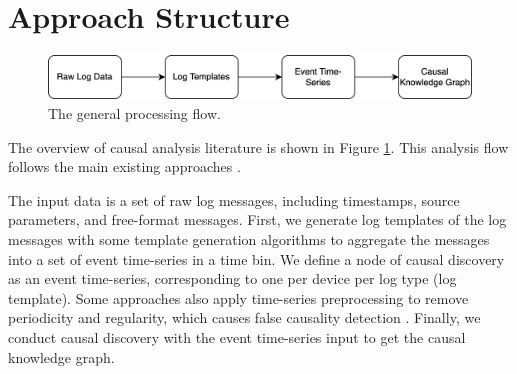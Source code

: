\section{Approach Structure}
\label{sec:2}
\begin{figure}[h]
\centering
    \label{fig:structure}
    \includegraphics[width=\textwidth]{figures/structure.png}
    \caption{The general processing flow.}
\end{figure}
The overview of causal analysis literature is shown in Figure \hyperref[fig:structure]{1}. This analysis flow follows the main existing approaches \cite{jarry2021quantitative,jia2017approach,kobayashi2017mining,lou2010mining,otomo2019latent}.\newline

The input data is a set of raw log messages, including timestamps, source parameters, and free-format messages. First, we generate log templates of the log messages with some template generation algorithms to aggregate the messages into a set of event time-series in a time bin. We define a node of causal discovery as an event time-series, corresponding to one per device per log type (log template). Some approaches also apply time-series preprocessing to remove periodicity and regularity, which causes false causality detection \cite{jarry2021quantitative,kobayashi2017mining}. Finally, we conduct causal discovery with the event time-series input to get the causal knowledge graph.